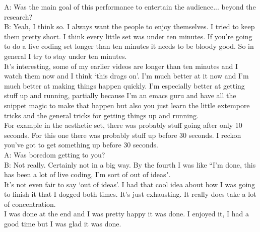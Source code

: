 A: Was the main goal of this performance to entertain the audience... beyond the research?\\

B: Yeah, I think so. I always want the people to enjoy themselves. I tried to keep them pretty short. I think every little set was under ten minutes. If you're going to do a live coding set longer than ten minutes it needs to be bloody good. So in general I try to stay under ten minutes.\\

It's interesting, some of my earlier videos are longer than ten minutes and I watch them now and I think `this drags on'. I'm much better at it now and I'm much better at making things happen quickly. I'm especially better at getting stuff up and running, partially because I'm an emacs guru and have all the snippet magic to make that happen but also you just learn the little extempore tricks and the general tricks for getting things up and running.\\

For example in the aesthetic set, there was probably stuff going after only 10 seconds. For this one there was probably stuff up before 30 seconds. I reckon you've got to get something up before 30 seconds.\\

A: Was boredom getting to you?\\

B: Not really. Certainly not in a big way. By the fourth I was like ``I'm done, this has been a lot of live coding, I'm sort of out of ideas".\\

It's not even fair to say `out of ideas'. I had that cool idea about how I was going to finish it that I dogged both times. It's just exhausting. It really does take a lot of concentration.\\

I was done at the end and I was pretty happy it was done. I enjoyed it, I had a good time but I was glad it was done.\\
